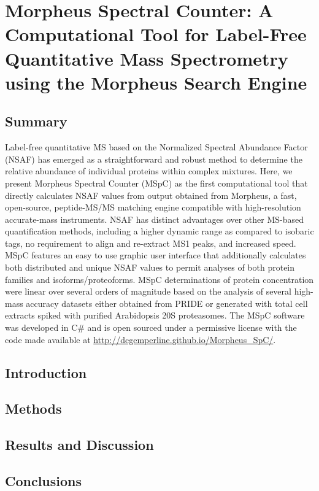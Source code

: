 \chapter{Morpheus Spectral Counter: A Computational Tool for Label-Free Quantitative Mass Spectrometry using the Morpheus Search Engine}

\section{Summary}
Label-free quantitative MS based on the Normalized Spectral Abundance Factor (NSAF) has emerged as a straightforward and robust method to determine the relative abundance of individual proteins within complex mixtures.  Here, we present Morpheus Spectral Counter (MSpC) as the first computational tool that directly calculates NSAF values from output obtained from Morpheus, a fast, open-source, peptide-MS/MS matching engine compatible with high-resolution accurate-mass instruments.  NSAF has distinct advantages over other MS-based quantification methods, including a higher dynamic range as compared to isobaric tags, no requirement to align and re-extract MS1 peaks, and increased speed.  MSpC features an easy to use graphic user interface that additionally calculates both distributed and unique NSAF values to permit analyses of both protein families and isoforms/proteoforms.  MSpC determinations of protein concentration were linear over several orders of magnitude based on the analysis of several high-mass accuracy datasets either obtained from PRIDE or generated with total cell extracts spiked with purified Arabidopsis 20S proteasomes.  The MSpC software was developed in C\# and is open sourced under a permissive license with the code made available at \url{http://dcgemperline.github.io/Morpheus_SpC/}. 

\section{Introduction}

\section{Methods}

\section{Results and Discussion}

\section{Conclusions}




